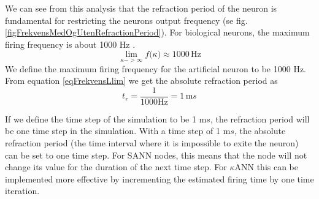 We can see from this analysis that the refraction period of the neuron is fundamental for restricting the neurons output frequency (se fig. \ref{figFrekvensMedOgUtenRefractionPeriod}).
For biological neurons, the maximum firing frequency is about 1000 Hz \cite{NeuroscienceExploringTheBrain3edKAP4}. %
\begin{equation}
	\lim_{\kappa->\infty}{ f(\kappa}) \approx 1000 \, \text{Hz}
\end{equation}
We define the maximum firing frequency for the artificial neuron to be 1000 Hz. From equation \ref{eqFrekvensLlim} we get the absolute refraction period as
\begin{equation}
	t_r = \frac{1}{1000 \text{Hz}} = 1 \, \text{m}s %
\end{equation}

If we define the time step of the simulation to be 1 m$s$, the refraction period will be one time step in the simulation.
With a time step of 1 m$s$, the absolute refraction period (the time interval where it is impossible to exite the neuron) can be set to one time step. 
For SANN nodes, this means that the node will not change its value for the duration of the next time step. 
For $\kappa$ANN this can be implemented more effective by incrementing the estimated firing time by one time iteration. 


